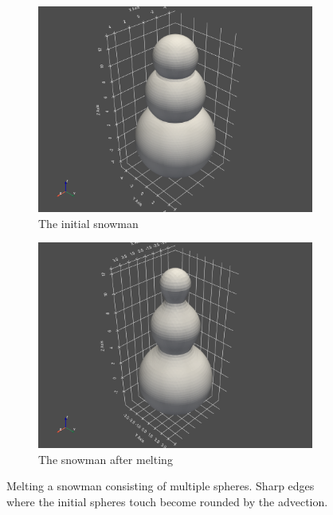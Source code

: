 \begin{figure}[h]
    \begin{subfigure}{0.45\textwidth}
    \includegraphics[width=1\linewidth]{res/task1.3_snowman1.png} 
    \caption{The initial snowman}
    
\end{subfigure}
    \begin{subfigure}{0.45\textwidth}
    \includegraphics[width=1\linewidth]{res/task1.3_snowman2.png}
    \caption{The snowman after melting}
\end{subfigure}

\caption{Melting a snowman consisting of multiple spheres. Sharp edges where the initial spheres touch become rounded by the advection.}
\end{figure}